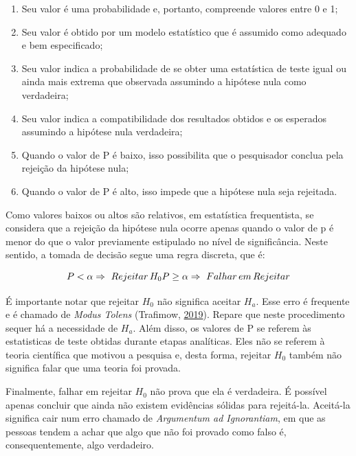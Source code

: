 \documentclass[
]{book}
\providecommand{\tightlist}{%
  \setlength{\itemsep}{0pt}\setlength{\parskip}{0pt}}
\begin{document}
\begin{enumerate}
\def\labelenumi{(\arabic{enumi})}
\tightlist
\item
  Seu valor é uma probabilidade e, portanto, compreende valores entre 0
  e 1;\\
\item
  Seu valor é obtido por um modelo estatístico que é assumido como
  adequado e bem especificado;\\
\item
  Seu valor indica a probabilidade de se obter uma estatística de teste
  igual ou ainda mais extrema que observada assumindo a hipótese nula
  como verdadeira;\\
\item
  Seu valor indica a compatibilidade dos resultados obtidos e os
  esperados assumindo a hipótese nula verdadeira;\\
\item
  Quando o valor de P é baixo, isso possibilita que o pesquisador
  conclua pela rejeição da hipótese nula;\\
\item
  Quando o valor de P é alto, isso impede que a hipótese nula seja
  rejeitada.
\end{enumerate}

Como valores baixos ou altos são relativos, em estatística frequentista,
se considera que a rejeição da hipótese nula ocorre apenas quando o
valor de p é menor do que o valor previamente estipulado no nível de
significância. Neste sentido, a tomada de decisão segue uma regra
discreta, que é:

\[P<\alpha \Rightarrow \ Rejeitar \, H_0 \\P    \geq \alpha \Rightarrow \ Falhar \,em \,Rejeitar \]

É importante notar que rejeitar \(H_0\) não significa aceitar \(H_a\).
Esse erro é frequente e é chamado de \emph{Modus Tolens} (Trafimow,
\protect\hyperlink{ref-Trafimow2019}{2019}). Repare que neste
procedimento sequer há a necessidade de \(H_a\). Além disso, os valores
de P se referem às estatisticas de teste obtidas durante etapas
analíticas. Eles não se referem à teoria científica que motivou a
pesquisa e, desta forma, rejeitar \(H_0\) também não significa falar que
uma teoria foi provada.

Finalmente, falhar em rejeitar \(H_0\) não prova que ela é verdadeira. É
possível apenas concluir que ainda não existem evidências sólidas para
rejeitá-la. Aceitá-la significa cair num erro chamado de
\emph{Argumentum ad Ignorantiam}, em que as pessoas tendem a achar que
algo que não foi provado como falso é, consequentemente, algo
verdadeiro.
\end{document}
